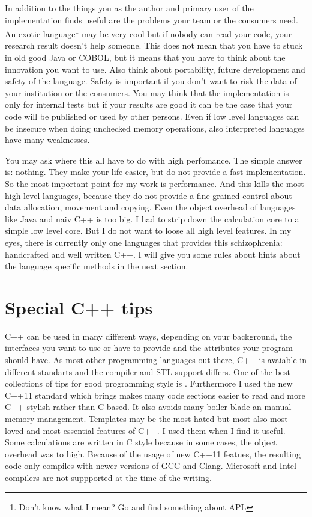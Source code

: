 In addition to the things you as the author and primary user of the implementation finds useful are the problems your team or the consumers need. An exotic language\footnote{Don't know what I mean? Go and find something about APL} may be very cool but if nobody can read your code, your research result doesn't help someone. This does not mean that you have to stuck in old good Java or COBOL, but it means that you have to think about the innovation you want to use. Also think about portability, future development and safety of the language. Safety is important if you don't want to risk the data of your institution or the consumers. You may think that the implementation is only for internal tests but if your results are good it can be the case that your code will be published or used by other persons. Even if low level languages can be insecure when doing unchecked memory operations, also interpreted languages have many weaknesses.

You may ask where this all have to do with high perfomance. The simple answer is: nothing. They make your life easier, but do not provide a fast implementation. So the most important point for my work is performance. And this kills the most high level languages, because they do not provide a fine grained control about data allocation, movement and copying. Even the object overhead of languages like Java and naiv C++ is too big. I had to strip down the calculation core to a simple low level core. But I do not want to loose all high level features. In my eyes, there is currently only one languages that provides this schizophrenia: handcrafted and well written C++. I will give you some rules about hints about the language specific methods in the next section.

\section{Special C++ tips}
C++ can be used in many different ways, depending on your background, the interfaces you want to use or have to provide and the attributes your program should have. As most other programming languages out there, C++ is avaiable in different standarts and the compiler and STL support differs. One of the best collections of tips for good programming style is \cite{effectiveCpp}. Furthermore I used the new C++11 standard which brings makes many code sections easier to read and more C++ stylish rather than C based. It also avoids many boiler blade an manual memory management. Templates may be the most hated but most also most loved and most essential features of C++. I used them when I find it useful. Some calculations are written in C style because in some cases, the object overhead was to high. Because of the usage of new C++11 featues, the resulting code only compiles with newer versions of GCC and Clang. Microsoft and Intel compilers are not suppported at the time of the writing.

